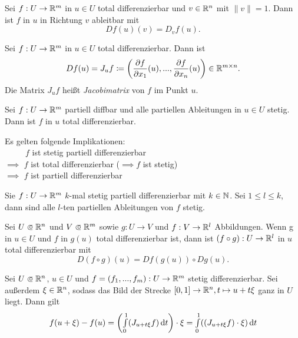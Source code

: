 \documentclass{cheat-sheet}
\begin{document}
\begin{satz}
Sei $f : U \to \mathbb{R}^m$ in $u \in U$ total differenzierbar und $v \in \mathbb{R}^n$ mit $\| v \| = 1$. Dann ist $f$ in $u$ in Richtung $v$ ableitbar mit
\[ D f(u) (v) = D_v f(u). \]
\end{satz}

\begin{defn}
Sei $f : U \to \mathbb{R}^m$ in $u \in U$ total differenzierbar. Dann ist
\[ D f(u) = J_u f \coloneqq \left( \frac{\partial f}{\partial x_1}(u), ..., \frac{\partial f}{\partial x_n}(u) \right) \in \mathbb{R}^{m \times n}. \]
Die Matrix $J_u f$ heißt \emph{Jacobimatrix} von $f$ im Punkt $u$.
\end{defn}


\begin{satz}
Sei $f : U \to \mathbb{R}^m$ partiell diffbar und alle partiellen Ableitungen in $u \in U$ stetig. Dann ist $f$ in $u$ total differenzierbar.
\end{satz}

\begin{bem}
Es gelten folgende Implikationen:\\
$\quad\quad\,\,\, f$ ist stetig partiell differenzierbar\\
$\implies$ $f$ ist total differenzierbar ($\!\implies f$ ist stetig)\\
$\implies$ $f$ ist partiell differenzierbar
\end{bem}

\begin{satz}
Sie $f : U \to \mathbb{R}^m$ $k$-mal stetig partiell differenzierbar mit $k \in \mathbb{N}$. Sei $1 \le l \le k$, dann sind alle $l$-ten partiellen Ableitungen von $f$ stetig.
\end{satz}

\begin{satz}[Kettenregel]
Sei $U \opn \R^n$ und $V \opn \R^m$ sowie $g : U \to V$ und $f : V \to \mathbb{R}^l$ Abbildungen. Wenn g in $u \in U$ und $f$ in $g(u)$ total differenzierbar ist, dann ist $(f \circ g) : U \to \mathbb{R}^l$ in $u$ total differenzierbar mit
\[ D(f \circ g)(u) = D f(g(u)) \circ D g(u). \]
\end{satz}


\begin{satz}[MWS]
Sei $U \opn \R^n$, $u \in U$ und $f = (f_1, ..., f_m) : U \to \mathbb{R}^m$ stetig differenzierbar. Sei außerdem $\xi \in \mathbb{R}^n$, sodass das Bild der Strecke $[0, 1] \to \mathbb{R}^n, t \mapsto u + t \xi$ ganz in $U$ liegt. Dann gilt
\[ f(u + \xi) - f(u) = \left( {\textstyle \int\limits_{0}^{1}} (J_{u + t \xi} f) \,\mathrm{d} t \right) \cdot \xi = {\textstyle \int\limits_{0}^{1}} ((J_{u + t \xi} f) \cdot \xi) \,\mathrm{d} t \]
\end{satz}
\end{document}

